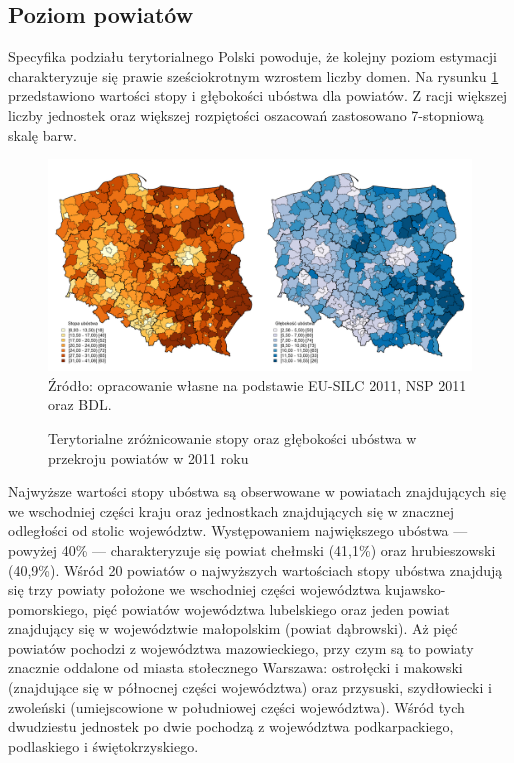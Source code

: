 
\subsection{Poziom powiatów}

Specyfika podziału terytorialnego Polski powoduje, że kolejny poziom estymacji charakteryzuje się prawie sześciokrotnym wzrostem liczby domen. Na rysunku \ref{fig:eb_nts4_hcr_pgi_7} przedstawiono wartości stopy i głębokości ubóstwa dla powiatów. Z racji większej liczby jednostek oraz większej rozpiętości oszacowań zastosowano 7-stopniową skalę barw. 

\begin{figure}[ht]
\caption{Terytorialne zróżnicowanie stopy oraz głębokości ubóstwa w przekroju powiatów w 2011 roku}
\centering
\includegraphics[width=\textwidth]{05_wykresy/eb_nts4_hcr_pgi_7.png}\\
\small{Źródło: opracowanie własne na podstawie EU-SILC 2011, NSP 2011 oraz BDL.}
\label{fig:eb_nts4_hcr_pgi_7}
\end{figure}

Najwyższe wartości stopy ubóstwa są obserwowane w powiatach znajdujących się we wschodniej części kraju oraz jednostkach znajdujących się w znacznej odległości od stolic województw. Występowaniem największego ubóstwa --- powyżej 40\% --- charakteryzuje się powiat chełmski (41,1\%) oraz hrubieszowski (40,9\%). Wśród 20 powiatów o najwyższych wartościach stopy ubóstwa znajdują się trzy powiaty położone we wschodniej części województwa kujawsko-pomorskiego, pięć powiatów województwa lubelskiego oraz jeden powiat znajdujący się w województwie małopolskim (powiat dąbrowski). Aż pięć powiatów pochodzi z województwa mazowieckiego, przy czym są to powiaty znacznie oddalone od miasta stołecznego Warszawa: ostrołęcki i makowski (znajdujące się w północnej części województwa) oraz przysuski, szydłowiecki i zwoleński (umiejscowione w południowej części województwa). Wśród tych dwudziestu jednostek po dwie pochodzą z województwa podkarpackiego, podlaskiego i świętokrzyskiego.

